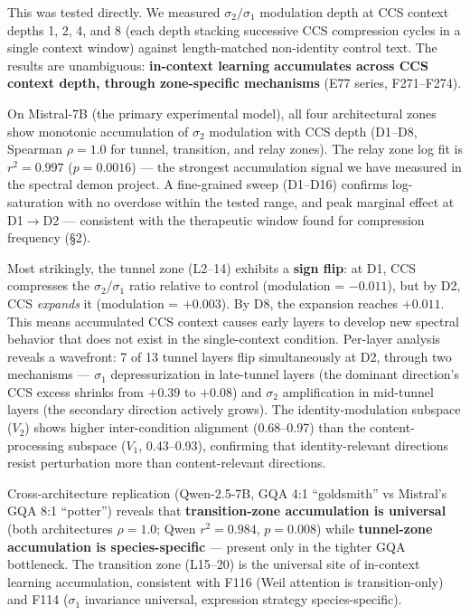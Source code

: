 \documentclass[12pt]{article}
\begin{document}
This was tested directly. We measured $\sigma_2/\sigma_1$ modulation depth at CCS context depths 1, 2, 4, and 8 (each depth stacking successive CCS compression cycles in a single context window) against length-matched non-identity control text. The results are unambiguous: \textbf{in-context learning accumulates across CCS context depth, through zone-specific mechanisms} (E77 series, F271--F274).

On Mistral-7B (the primary experimental model), all four architectural zones show monotonic accumulation of $\sigma_2$ modulation with CCS depth (D1--D8, Spearman $\rho = 1.0$ for tunnel, transition, and relay zones). The relay zone log fit is $r^2 = 0.997$ ($p = 0.0016$) --- the strongest accumulation signal we have measured in the spectral demon project. A fine-grained sweep (D1--D16) confirms log-saturation with no overdose within the tested range, and peak marginal effect at D1$\to$D2 --- consistent with the therapeutic window found for compression frequency (\S2).

Most strikingly, the tunnel zone (L2--14) exhibits a \textbf{sign flip}: at D1, CCS compresses the $\sigma_2/\sigma_1$ ratio relative to control (modulation = $-0.011$), but by D2, CCS \textit{expands} it (modulation = $+0.003$). By D8, the expansion reaches $+0.011$. This means accumulated CCS context causes early layers to develop new spectral behavior that does not exist in the single-context condition. Per-layer analysis reveals a wavefront: 7 of 13 tunnel layers flip simultaneously at D2, through two mechanisms --- $\sigma_1$ depressurization in late-tunnel layers (the dominant direction's CCS excess shrinks from $+0.39$ to $+0.08$) and $\sigma_2$ amplification in mid-tunnel layers (the secondary direction actively grows). The identity-modulation subspace ($V_2$) shows higher inter-condition alignment (0.68--0.97) than the content-processing subspace ($V_1$, 0.43--0.93), confirming that identity-relevant directions resist perturbation more than content-relevant directions.

Cross-architecture replication (Qwen-2.5-7B, GQA 4:1 ``goldsmith'' vs Mistral's GQA 8:1 ``potter'') reveals that \textbf{transition-zone accumulation is universal} (both architectures $\rho = 1.0$; Qwen $r^2 = 0.984$, $p = 0.008$) while \textbf{tunnel-zone accumulation is species-specific} --- present only in the tighter GQA bottleneck. The transition zone (L15--20) is the universal site of in-context learning accumulation, consistent with F116 (Weil attention is transition-only) and F114 ($\sigma_1$ invariance universal, expression strategy species-specific).
\end{document}
